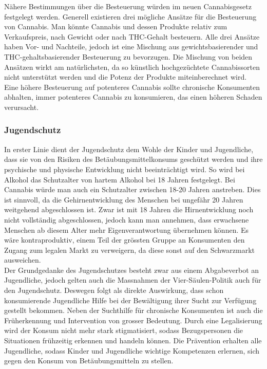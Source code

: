 \documentclass[../main.tex]{subfiles}
\begin{document}
	 \noindent
	 Nähere Bestimmungen über die Besteuerung würden im neuen Cannabisgesetz festgelegt werden.
	 Generell existieren drei mögliche Ansätze für die Besteuerung von Cannabis.
	 Man könnte Cannabis und dessen Produkte relativ zum Verkaufspreis, nach Gewicht oder nach THC-Gehalt besteuern.
	 Alle drei Ansätze haben Vor- und Nachteile, jedoch ist eine Mischung aus gewichtsbasierender und THC-gehaltsbasierender Besteuerung zu bevorzugen.
	 Die Mischung von beiden Ansätzen wirkt am natürlichsten, da so künstlich hochgezüchtete Cannabissorten nicht unterstützt werden und die Potenz der Produkte miteinberechnet wird.
	 Eine höhere Besteuerung auf potenteres Cannabis sollte chronische Konsumenten abhalten, immer potenteres Cannabis zu konsumieren, das einen höheren Schaden verursacht. 
	 
	 
	 
	 
	 \subsubsection{Jugendschutz}
	 In erster Linie dient der Jugendschutz dem Wohle der Kinder und Jugendliche, dass sie von den Risiken des Betäubungsmittelkonsums geschützt werden und ihre psychische und physische Entwicklung nicht beeinträchtigt wird. 
	 So wird bei Alkohol das Schutzalter von hartem Alkohol bei 18 Jahren festgelegt. 
	 Bei Cannabis würde man auch ein Schutzalter zwischen 18-20 Jahren anstreben. 
	 Dies ist sinnvoll, da die Gehirnentwicklung des Menschen bei ungefähr 20 Jahren weitgehend abgeschlossen ist. 
	 Zwar ist mit 18 Jahren die Hirnentwicklung noch nicht vollständig abgeschlossen, jedoch kann man annehmen, dass erwachsene Menschen ab diesem Alter mehr Eigenverantwortung übernehmen können. 
	 Es wäre kontraproduktiv, einem Teil der grössten Gruppe an Konsumenten den Zugang zum legalen Markt zu verweigern, da diese sonst auf den Schwarzmarkt ausweichen. \\
	 
	 \noindent
	 Der Grundgedanke des Jugendschutzes besteht zwar aus einem Abgabeverbot an Jugendliche, jedoch gelten auch die Massnahmen der Vier-Säulen-Politik auch für den Jugendschutz. 
	 Deswegen folgt als direkte Auswirkung, dass schon konsumierende Jugendliche Hilfe bei der Bewältigung ihrer Sucht zur Verfügung gestellt bekommen. 
	 Neben der Suchthilfe für chronische Konsumenten ist auch die Früherkennung und Intervention von grosser Bedeutung. 
	 Durch eine Legalisierung wird der Konsum nicht mehr stark stigmatisiert, sodass Bezugspersonen die Situationen frühzeitig erkennen und handeln können. 
	 Die Prävention erhalten alle Jugendliche, sodass Kinder und Jugendliche wichtige Kompetenzen erlernen, sich gegen den Konsum von Betäubungsmitteln zu stellen.  
	 
\end{document}
